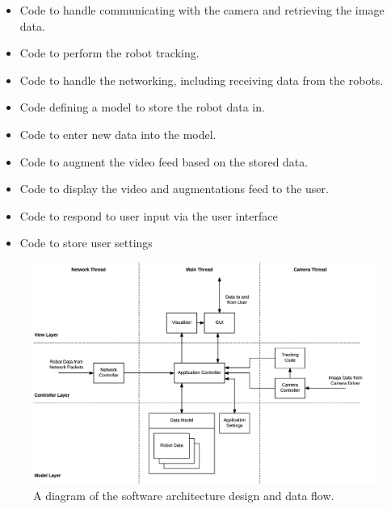 \begin{itemize}
\item Code to handle communicating with the camera and retrieving the image data.
\item Code to perform the robot tracking.
\item Code to handle the networking, including receiving data from the robots.
\item Code defining a model to store the robot data in.
\item Code to enter new data into the model.
\item Code to augment the video feed based on the stored data.
\item Code to display the video and augmentations feed to the user.
\item Code to respond to user input via the user interface
\item Code to store user settings
\end{itemize}

\begin{figure}
	\centering
	\includegraphics[scale=0.7]{Figures/SoftwareArchitecture.png}
	\decoRule
	\caption[Software Architecture Diagram]{A diagram of the software architecture design and data flow.}
	\label{fig:SoftwareArchitecture}
\end{figure}

